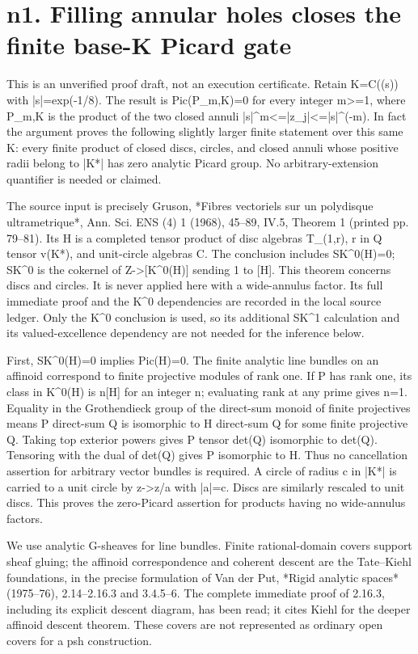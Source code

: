 \documentclass[11pt]{article}
\begin{document}
\section{n1. Filling annular holes closes the finite base-K Picard gate}

This is an unverified proof draft, not an execution certificate. Retain K=C((s)) with |s|=exp(-1/8). The result is Pic(P\_m,K)=0 for every integer m>=1, where P\_m,K is the product of the two closed annuli |s|\textasciicircum{}m<=|z\_j|<=|s|\textasciicircum{}(-m). In fact the argument proves the following slightly larger finite statement over this same K: every finite product of closed discs, circles, and closed annuli whose positive radii belong to |K*| has zero analytic Picard group. No arbitrary-extension quantifier is needed or claimed.

The source input is precisely Gruson, *Fibres vectoriels sur un polydisque ultrametrique*, Ann. Sci. ENS (4) 1 (1968), 45--89, IV.5, Theorem 1 (printed pp. 79--81). Its H is a completed tensor product of disc algebras T\_(1,r), r in Q tensor v(K*), and unit-circle algebras C. The conclusion includes SK\textasciicircum{}0(H)=0; SK\textasciicircum{}0 is the cokernel of Z->[K\textasciicircum{}0(H)] sending 1 to [H]. This theorem concerns discs and circles. It is never applied here with a wide-annulus factor. Its full immediate proof and the K\textasciicircum{}0 dependencies are recorded in the local source ledger. Only the K\textasciicircum{}0 conclusion is used, so its additional SK\textasciicircum{}1 calculation and its valued-excellence dependency are not needed for the inference below.

First, SK\textasciicircum{}0(H)=0 implies Pic(H)=0. The finite analytic line bundles on an affinoid correspond to finite projective modules of rank one. If P has rank one, its class in K\textasciicircum{}0(H) is n[H] for an integer n; evaluating rank at any prime gives n=1. Equality in the Grothendieck group of the direct-sum monoid of finite projectives means P direct-sum Q is isomorphic to H direct-sum Q for some finite projective Q. Taking top exterior powers gives P tensor det(Q) isomorphic to det(Q). Tensoring with the dual of det(Q) gives P isomorphic to H. Thus no cancellation assertion for arbitrary vector bundles is required. A circle of radius c in |K*| is carried to a unit circle by z->z/a with |a|=c. Discs are similarly rescaled to unit discs. This proves the zero-Picard assertion for products having no wide-annulus factors.

We use analytic G-sheaves for line bundles. Finite rational-domain covers support sheaf gluing; the affinoid correspondence and coherent descent are the Tate--Kiehl foundations, in the precise formulation of Van der Put, *Rigid analytic spaces* (1975--76), 2.14--2.16.3 and 3.4.5--6. The complete immediate proof of 2.16.3, including its explicit descent diagram, has been read; it cites Kiehl for the deeper affinoid descent theorem. These covers are not represented as ordinary open covers for a psh construction.
\end{document}
